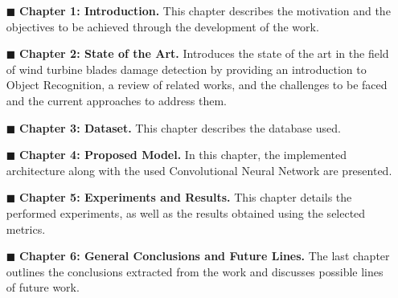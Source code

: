\begin{itemize}[]
    \item[\tiny$\blacksquare$]\textbf{Chapter 1: Introduction.} This chapter describes the motivation and the objectives to be achieved through the development of the work.
    \item[\tiny$\blacksquare$] \textbf{Chapter 2: State of the Art.} Introduces the state of the art in the field of wind turbine blades damage detection by providing an introduction to Object Recognition, a review of related works, and the challenges to be faced and the current approaches to address them.
    \item[\tiny$\blacksquare$] \textbf{Chapter 3: Dataset.} This chapter describes the database used.
    \item[\tiny$\blacksquare$] \textbf{Chapter 4: Proposed Model.} In this chapter, the implemented architecture along with the used Convolutional Neural Network are presented.  
    \item[\tiny$\blacksquare$] \textbf{Chapter 5: Experiments and Results.} This chapter details the performed experiments, as well as the results obtained using the selected metrics.
    \item[\tiny$\blacksquare$] \textbf{Chapter 6: General Conclusions and Future Lines.} The last chapter outlines the conclusions extracted from the work and discusses possible lines of future work.
\end{itemize}



